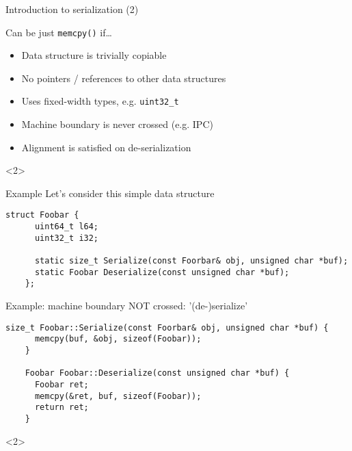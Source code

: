 \begin{frame}{Introduction to serialization (2)}
  \begin{block}{Can be just \texttt{memcpy()} if\ldots}
    \begin{itemize}
      \itemsep=1em
    \item Data structure is trivially copiable

    \item No pointers / references to other data structures

    \item Uses fixed-width types, e.g. \texttt{uint32\_t}

    \item Machine boundary is never crossed (e.g. IPC)

    \item Alignment is satisfied on de-serialization
    \end{itemize}
  \end{block}

  \begin{onlyenv}<2>
  \end{onlyenv}
\end{frame}

\begin{frame}[fragile]{Example}
  Let's consider this simple data structure
  \begin{lstlisting}[style=c++]
    struct Foobar {
      uint64_t l64;
      uint32_t i32;

      static size_t Serialize(const Foorbar& obj, unsigned char *buf);
      static Foobar Deserialize(const unsigned char *buf);
    };
  \end{lstlisting}
\end{frame}

\begin{frame}[fragile]{Example: machine boundary NOT crossed: '(de-)serialize'}
  \begin{lstlisting}[style=c++]
    size_t Foobar::Serialize(const Foorbar& obj, unsigned char *buf) {
      memcpy(buf, &obj, sizeof(Foobar));
    }

    Foobar Foobar::Deserialize(const unsigned char *buf) {
      Foobar ret;
      memcpy(&ret, buf, sizeof(Foobar));
      return ret;
    }
  \end{lstlisting}

  \begin{onlyenv}<2>
  \end{onlyenv}
\end{frame}

